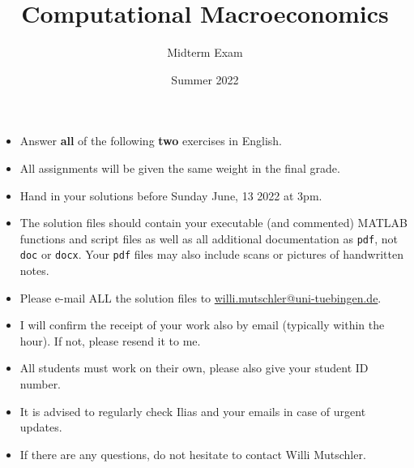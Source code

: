 \documentclass{article}
\begin{document}
	
\title{Computational Macroeconomics}
\author{Midterm Exam}
\date{Summer 2022}
\maketitle


\begin{itemize}
    \item Answer \textbf{all} of the following \textbf{two} exercises in English.
    \item All assignments will be given the same weight in the final grade.
    \item Hand in your solutions before Sunday June, 13 2022 at 3pm.
    \item The solution files should contain your executable (and commented) MATLAB functions and script files
        as well as all additional documentation as \texttt{pdf}, not \texttt{doc} or \texttt{docx}.
    Your \texttt{pdf} files may also include scans or pictures of handwritten notes.
    \item Please e-mail ALL the solution files to \url{willi.mutschler@uni-tuebingen.de}.
    \item I will confirm the receipt of your work also by email (typically within the hour). If not, please resend it to me.		
    \item All students must work on their own, please also give your student ID number.		
    \item It is advised to regularly check Ilias and your emails in case of urgent updates.
    \item If there are any questions, do not hesitate to contact Willi Mutschler.
\end{itemize}
\newpage
\end{document}
